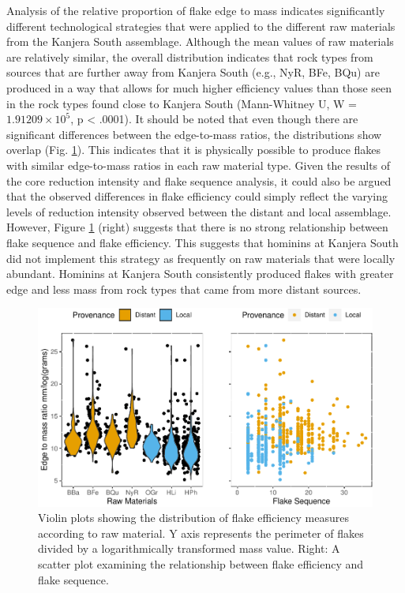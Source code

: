 \documentclass[]{elsarticle} %
\begin{document}
Analysis of the relative proportion of flake edge to mass indicates
significantly different technological strategies that were applied to
the different raw materials from the Kanjera South assemblage. Although
the mean values of raw materials are relatively similar, the overall
distribution indicates that rock types from sources that are further
away from Kanjera South (e.g., NyR, BFe, BQu) are produced in a way that
allows for much higher efficiency values than those seen in the rock
types found close to Kanjera South (Mann-Whitney U, W =
\ensuremath{1.91209\times 10^{5}}, p \textless{} .0001). It should be
noted that even though there are significant differences between the
edge-to-mass ratios, the distributions show overlap (\hspace{0pt}Fig.
\ref{flake_efficiency}\hspace{0pt}). This indicates that it is
physically possible to produce flakes with similar edge-to-mass ratios
in each raw material type. Given the results of the core reduction
intensity and flake sequence analysis, it could also be argued that the
observed differences in flake efficiency could simply reflect the
varying levels of reduction intensity observed between the distant and
local assemblage. However, \hspace{0pt}Figure
\ref{flake_efficiency}\hspace{0pt} (right) suggests that there is no
strong relationship between flake sequence and flake efficiency. This
suggests that hominins at Kanjera South did not implement this strategy
as frequently on raw materials that were locally abundant. Hominins at
Kanjera South consistently produced flakes with greater edge and less
mass from rock types that came from more distant sources.

\begin{figure}
\centering
\includegraphics{Kanjera_South_Manuscript_files/figure-latex/fig-6-1.pdf}
\caption{Violin plots showing the distribution of flake efficiency
measures according to raw material. Y axis represents the perimeter of
flakes divided by a logarithmically transformed mass value. Right: A
scatter plot examining the relationship between flake efficiency and
flake sequence. \label{flake_efficiency}}
\end{figure}
\end{document}
